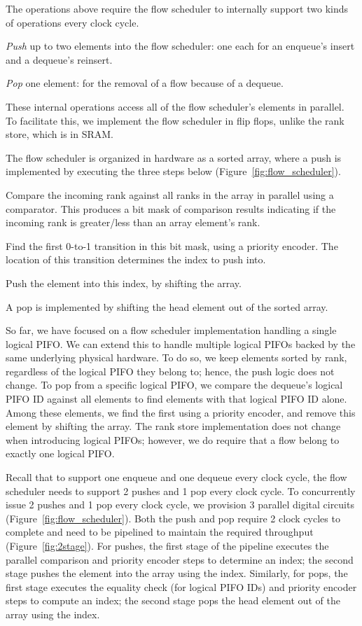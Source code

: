 The operations above require the flow scheduler to internally support two kinds
of operations every clock cycle.
\begin{CompactEnumerate}
\item {\em Push} up to two elements into the flow scheduler: one each for an
  enqueue's insert and a dequeue's reinsert.
\item {\em Pop} one element: for the removal of a flow because of a dequeue.
\end{CompactEnumerate}
These internal operations access all of the flow scheduler's elements in
parallel. To facilitate this, we implement the flow scheduler in flip flops,
unlike the rank store, which is in SRAM.

The flow scheduler is organized in hardware as a sorted array, where a push is
implemented by executing the three steps below
(Figure~\ref{fig:flow_scheduler}).
\begin{CompactEnumerate}
\item Compare the incoming rank against all ranks in the array in parallel using a comparator.
  This produces a bit mask of comparison results indicating if the incoming rank
  is greater/less than an array element's rank.
\item Find the first 0-to-1 transition in this bit mask, using a priority encoder. The location of this transition determines the index to push into.
\item Push the element into this index, by shifting the array.
\end{CompactEnumerate}
A pop is implemented by shifting the head element out of the sorted array.

So far, we have focused on a flow scheduler implementation handling a single
logical PIFO. We can extend this to handle multiple logical PIFOs backed by the
same underlying physical hardware. To do so, we keep elements sorted by rank,
regardless of the logical PIFO they belong to; hence, the push logic does not
change.  To pop from a specific logical PIFO, we compare the dequeue's logical
PIFO ID against all elements to find elements with that logical PIFO ID alone.
Among these elements, we find the first using a priority encoder, and remove
this element by shifting the array.  The rank store implementation does not
change when introducing logical PIFOs; however, we do require that a flow
belong to exactly one logical PIFO.

Recall that to support one enqueue and one dequeue every clock cycle, the flow
scheduler needs to support 2 pushes and 1 pop every clock cycle. To concurrently
issue 2 pushes and 1 pop every clock cycle, we provision 3 parallel digital circuits
(Figure~\ref{fig:flow_scheduler}). Both the push and pop require 2 clock cycles to
complete and need to be pipelined to maintain the required throughput
(Figure~\ref{fig:2stage}). For pushes, the first stage of the pipeline executes
the parallel comparison and priority encoder steps to determine an index; the
second stage pushes the element into the array using the index.  Similarly, for
pops, the first stage executes the equality check (for logical PIFO IDs) and
priority encoder steps to compute an index; the second stage pops the head
element out of the array using the index.

